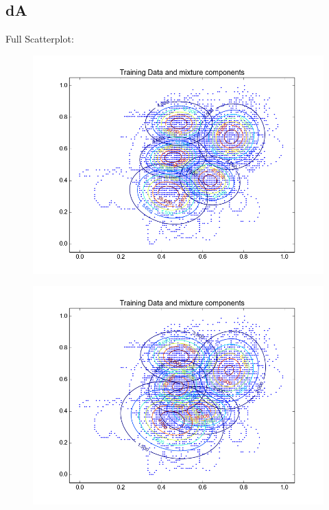 \documentclass[11pt,a4paper]{article}
\begin{document}
\subsection{dA}
Full Scatterplot: \\
\begin{minipage}[b]{0.25\textwidth}
\begin{figure}[H]
  \centering
  \includegraphics[width=.8\linewidth]{Figures/contours_dA.test0.png}
  \label{fig:sfig1}
\end{figure}%
\end{minipage}
\begin{minipage}[b]{0.25\textwidth}
\begin{figure}[H]
  \centering
  \includegraphics[width=.8\linewidth]{Figures/contours_dA.test5.png}

  \label{fig:sfig1}
\end{figure}%
\end{minipage}
\end{document}
